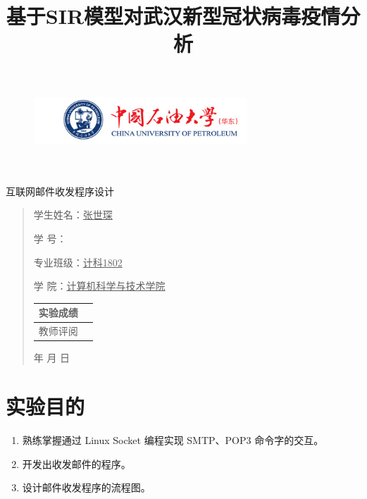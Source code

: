 \documentclass{article}
\title{基于SIR模型对武汉新型冠状病毒疫情分析}
\date{}
\renewcommand{\today}{\number\year 年 \number\month 月 \number\day 日}
\begin{document}
\begin{figure}
    \includegraphics[width=8cm]{upc.png}

    \label{figupc}
\end{figure}

  \begin{center}
    \quad \\
    \quad \\
    \heiti \fontsize{45}{17} \quad \quad \quad 
    \vskip 1.5cm
    \heiti {} 互联网邮件收发程序设计
  \end{center}
  \vskip 2.0cm
    
  \begin{quotation}
    \doublespacing
    
        \par\setlength\parindent{7em}
    \qquad 

    学生姓名：\underline{\qquad  张世琛 \qquad \qquad}

    学\hspace{0.61cm} 号：\underline{\qquad}
    
    专业班级：\underline{\qquad 计科1802 \qquad  }
    
    学\hspace{0.61cm} 院：\underline{计算机科学与技术学院}
    \vskip 1cm
    \centering
    \begin{table}[h]
            \centering 
            \begin{tabular}{|p{3.5cm}<{\centering}|p{9cm}<{\centering}|}
                \hline
                实验成绩 & \\ [6pt]
                \hline
                教师评阅& \\ [85pt]
                \hline
            \end{tabular}
        \end{table}
    \vskip 1cm
    \today
  \end{quotation}
\thispagestyle{empty}
\newpage
\setcounter{page}{1}
\songti{}
\section{实验目的}
\begin{enumerate}
    \item 熟练掌握通过 Linux Socket 编程实现 SMTP、POP3 命令字的交互。
    \item 开发出收发邮件的程序。
    \item 设计邮件收发程序的流程图。
\end{enumerate}
\end{document}

